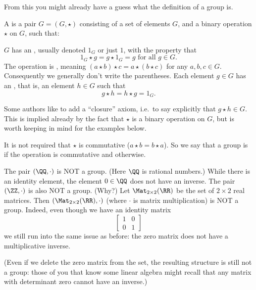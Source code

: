 From this you might already have a guess what the definition of a group is.
\begin{definition}
	A  is a pair $G = (G, \star)$
	consisting of a set of elements $G$, and a binary operation $\star$ on $G$, such that:
	\begin{itemize}
		\ii $G$ has an , usually denoted $1_G$
		or just $1$, with the property that
		\[ 1_G \star g = g \star 1_G = g \text{ for all $g \in G$}. \]
		\ii The operation is , meaning
		$(a \star b) \star c = a \star (b \star c)$
		for any $a,b,c \in G$.
		Consequently we generally don't write the parentheses.
		\ii Each element $g \in G$ has an , that is, an element $h \in G$ such that \[ g \star h = h \star g = 1_G. \]
	\end{itemize}
	\label{def:group}
\end{definition}
\begin{remark}
	Some authors like to add a ``closure'' axiom,
	i.e.\ to say explicitly that $g \star h \in G$.
	This is implied already by the fact that $\star$
	is a binary operation on $G$,
	but is worth keeping in mind for the examples below.
\end{remark}

\begin{remark}
	It is not required that $\star$ is commutative ($a \star b = b \star a$).
	So we say that a group is  if the operation is
	commutative and  otherwise.
\end{remark}


\begin{example}
	\listhack
	\begin{itemize}
		\ii The pair $(\QQ, \cdot)$ is NOT a group.
		(Here $\QQ$ is rational numbers.)
		While there is an identity element, the element $0 \in \QQ$
		does not have an inverse.
		\ii The pair $(\ZZ, \cdot)$ is also NOT a group. (Why?)
		\ii Let $\Mat_{2 \times 2}(\RR)$ be the set of $2 \times 2$ real matrices.
		Then $(\Mat_{2 \times 2}(\RR), \cdot)$
		(where $\cdot$ is matrix multiplication) is NOT a group.
		Indeed, even though we have an identity matrix
		\[
			\begin{bmatrix}
				1 & 0 \\ 0 & 1
			\end{bmatrix}
		\]
		we still run into the same issue as before:
		the zero matrix does not have a multiplicative inverse.

		(Even if we delete the zero matrix from the set,
		the resulting structure is still not a group:
		those of you that know some linear algebra
		might recall that any matrix with determinant zero
		cannot have an inverse.)
	\end{itemize}
\end{example}


